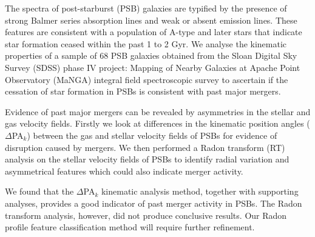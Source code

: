 
The spectra of post-starburst (PSB) galaxies are typified by the presence of strong Balmer series absorption lines and weak or absent emission lines. These features are consistent with a population of A-type and later stars that indicate star formation ceased within the past 1 to 2 Gyr. We analyse the kinematic properties of a sample of 68 PSB galaxies obtained from the Sloan Digital Sky Survey (SDSS) phase IV project: Mapping of Nearby Galaxies at Apache Point Observatory (MaNGA) integral field spectroscopic survey to ascertain if the cessation of star formation in PSBs is consistent with past major mergers. 

Evidence of past major mergers can be revealed by asymmetries in the stellar and gas velocity fields. Firstly we look at differences in the kinematic position angles ($\Delta$PA$_{k}$) between the gas and stellar velocity fields of PSBs for evidence of disruption caused by mergers. We then performed a Radon transform (RT) analysis on the stellar velocity fields of PSBs to identify radial variation and asymmetrical features which could also indicate merger activity. 

We found that the $\Delta$PA$_{k}$ kinematic analysis method, together with supporting analyses, provides a good indicator of past merger activity in PSBs. The Radon transform analysis, however, did not produce conclusive results. Our Radon profile feature classification method will require further refinement.